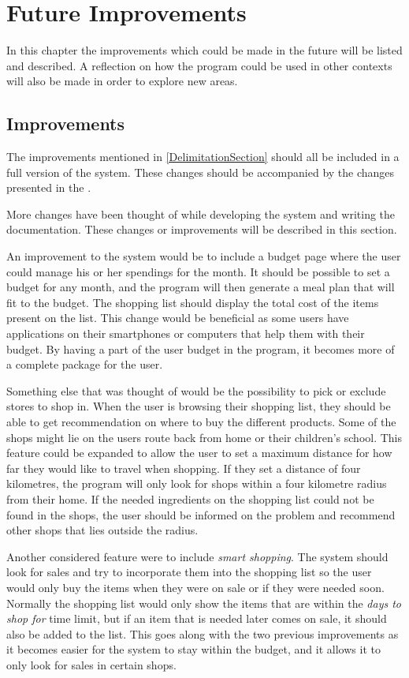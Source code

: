 \chapter{Future Improvements}
In this chapter the improvements which could be made in the future will be listed and described. A reflection on how the program could be used in other contexts will also be made in order to explore new areas.

\section{Improvements}
The improvements mentioned in \cref{DelimitationSection} should all be included in a full version of the system. These changes should be accompanied by the changes presented in the .

More changes have been thought of while developing the system and writing the documentation. These changes or improvements will be described in this section.

An improvement to the system would be to include a budget page where the user could manage his or her spendings for the month. It should be possible to set a budget for any month, and the program will then generate a meal plan that will fit to the budget. The shopping list should display the total cost of the items present on the list. This change would be beneficial as some users have applications on their smartphones or computers that help them with their budget. By having a part of the user budget in the program, it becomes more of a complete package for the user.

Something else that was thought of would be the possibility to pick or exclude stores to shop in. When the user is browsing their shopping list, they should be able to get recommendation on where to buy the different products. Some of the shops might lie on the users route back from home or their children's school. This feature could be expanded to allow the user to set a maximum distance for how far they would like to travel when shopping. If they set a distance of four kilometres, the program will only look for shops within a four kilometre radius from their home. If the needed ingredients on the shopping list could not be found in the shops, the user should be informed on the problem and recommend other shops that lies outside the radius.

Another considered feature were to include \textit{smart shopping}. The system should look for sales and try to incorporate them into the shopping list so the user would only buy the items when they were on sale or if they were needed soon. Normally the shopping list would only show the items that are within the \textit{days to shop for} time limit, but if an item that is needed later comes on sale, it should also be added to the list. This goes along with the two previous improvements as it becomes easier for the system to stay within the budget, and it allows it to only look for sales in certain shops.

